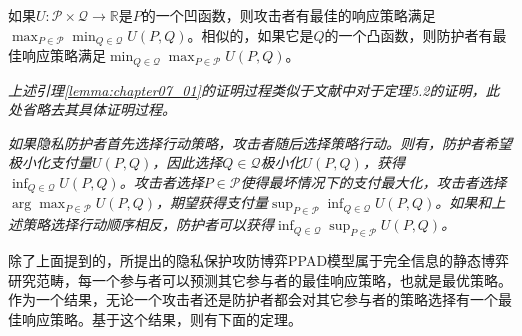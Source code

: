 \begin{lemma} \label{lemma:chapter07_01}
	如果$U:\mathcal{P}\times \mathcal{Q}\rightarrow\mathbb{R}$是$P$的一个凹函数，则攻击者有最佳的响应策略满足$\max_{P\in \mathcal{P}}\min_{Q \in \mathcal{Q}}U(P,Q)$。相似的，如果它是$Q$的一个凸函数，则防护者有最佳响应策略满足$\min_{Q \in \mathcal{Q}}\max_{P \in \mathcal{P}}U(P,Q)$。
\end{lemma}

{\em 上述引理\textup{\ref{lemma:chapter07_01}}的证明过程类似于文献\textup{}中对于定理\textup{5.2}的证明，此处省略去其具体证明过程。
}
\begin{remark}{\em
如果隐私防护者首先选择行动策略，攻击者随后选择策略行动。则有，防护者希望极小化支付量$U(P,Q)$，因此选择$Q \in \mathcal{Q}$极小化$U(P,Q)$，获得$\inf _{Q \in \mathcal{Q}}U(P,Q)$。攻击者选择$P \in \mathcal{P}$使得最坏情况下的支付最大化，攻击者选择$\arg\max_{P\in \mathcal{P}}U(P,Q)$，期望获得支付量$\sup_{P\in\mathcal{P}}\inf_{Q \in \mathcal{Q}}U(P,Q)$。如果和上述策略选择行动顺序相反，防护者可以获得$\inf_{Q \in \mathcal{Q}}\sup_{P\in \mathcal{P}}U(P,Q)$。
}
\end{remark}

除了上面提到的，所提出的隐私保护攻防博弈PPAD模型属于完全信息的静态博弈研究范畴，每一个参与者可以预测其它参与者的最佳响应策略，也就是最优策略。作为一个结果，无论一个攻击者还是防护者都会对其它参与者的策略选择有一个最佳响应策略。基于这个结果，则有下面的定理。

